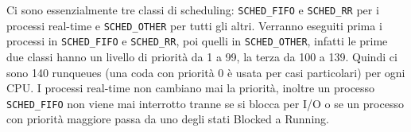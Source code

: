 Ci sono essenzialmente tre classi di scheduling: \verb|SCHED_FIFO| e \verb|SCHED_RR| per i processi real-time e \verb|SCHED_OTHER| per tutti gli altri. Verranno eseguiti prima i processi in \verb|SCHED_FIFO| e \verb|SCHED_RR|, poi quelli in \verb|SCHED_OTHER|, infatti le prime due classi hanno un livello di priorità da 1 a 99, la terza da 100 a 139. Quindi ci sono 140 runqueues (una coda con priorità 0 è usata per casi particolari) per ogni CPU.
I processi real-time non cambiano mai la priorità, inoltre un processo \verb|SCHED_FIFO| non viene mai interrotto tranne se si blocca per I/O o se un processo con priorità maggiore passa da uno degli stati Blocked a Running.